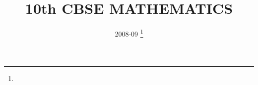 \documentclass[journal,12pt,twocolumn]{IEEEtran}
\DeclareMathOperator*{\Res}{Res}
\begin{document}
\newtheorem{theorem}{Theorem}[section]
\newtheorem{problem}{Problem}
\newtheorem{proposition}{Proposition}[section]
\newtheorem{lemma}{Lemma}[section]
\newtheorem{corollary}[theorem]{Corollary}
\newtheorem{example}{Example}[section]
\newtheorem{definition}[problem]{Definition}
\newcommand{\BEQA}{\begin{eqnarray}}
\newcommand{\EEQA}{\end{eqnarray}}
\newcommand{\define}{\stackrel{\triangle}{=}}

\providecommand{\mbf}{\mathbf}
\providecommand{\pr}[1]{\ensuremath{\Pr\left(#1\right)}}
\providecommand{\qfunc}[1]{\ensuremath{Q\left(#1\right)}}
\providecommand{\sbrak}[1]{\ensuremath{{}\left[#1\right]}}
\providecommand{\lsbrak}[1]{\ensuremath{{}\left[#1\right.}}
\providecommand{\rsbrak}[1]{\ensuremath{{}\left.#1\right]}}
\providecommand{\brak}[1]{\ensuremath{\left(#1\right)}}
\providecommand{\lbrak}[1]{\ensuremath{\left(#1\right.}}
\providecommand{\rbrak}[1]{\ensuremath{\left.#1\right)}}
\providecommand{\cbrak}[1]{\ensuremath{\left\{#1\right\}}}
\providecommand{\lcbrak}[1]{\ensuremath{\left\{#1\right.}}
\providecommand{\rcbrak}[1]{\ensuremath{\left.#1\right\}}}
\theoremstyle{remark}
\newtheorem{rem}{Remark}
\newcommand{\sgn}{\mathop{\mathrm{sgn}}}
\providecommand{\abs}[1]{\left\vert#1\right\vert}
\providecommand{\res}[1]{\Res\displaylimits_{#1}} 
\providecommand{\norm}[1]{\left\lVert#1\right\rVert}
\providecommand{\mtx}[1]{\mathbf{#1}}
\providecommand{\mean}[1]{E\left[ #1 \right]}
\providecommand{\fourier}{\overset{\mathcal{F}}{ \rightleftharpoons}}
\providecommand{\system}{\overset{\mathcal{H}}{ \longleftrightarrow}}
\newcommand{\solution}{\noindent \textbf{Solution: }}
\newcommand{\cosec}{\,\text{cosec}\,}
\providecommand{\dec}[2]{\ensuremath{\overset{#1}{\underset{#2}{\gtrless}}}}
\newcommand{\myvec}[1]{\ensuremath{\begin{pmatrix}#1\end{pmatrix}}}
\newcommand{\mydet}[1]{\ensuremath{\begin{vmatrix}#1\end{vmatrix}}}
\makeatletter
{}
\makeatother
\let\StandardTheFigure\thefigure
\let\vec\mathbf
\renewcommand{\thefigure}{\theproblem}
\def\putbox#1#2#3{\makebox[0in][l]{\makebox[#1][l]{}\raisebox{\baselineskip}[0in][0in]{\raisebox{#2}[0in][0in]{#3}}}}
     \def\rightbox#1{\makebox[0in][r]{#1}}
     \def\centbox#1{\makebox[0in]{#1}}
     \def\topbox#1{\raisebox{-\baselineskip}[0in][0in]{#1}}
     \def\midbox#1{\raisebox{-0.5\baselineskip}[0in][0in]{#1}}
\vspace{3cm}
\title{10th CBSE MATHEMATICS}
\author{ 2008-09
	\thanks{}
}
\maketitle
\newpage
\bigskip
\renewcommand{\thefigure}{\theenumi}
\renewcommand{\thetable}{\theenumi}
\end{document}
